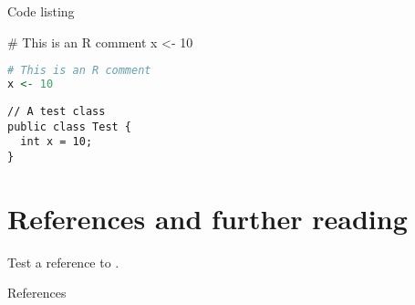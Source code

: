 \lipsum[4]

\begin{frame}[fragile]{Code listing}

\begin{rcode}
# This is an R comment
x <- 10
\end{rcode}

\begin{lstlisting}[language=R]
# This is an R comment
x <- 10
\end{lstlisting}

\begin{lstlisting}
// A test class
public class Test {
  int x = 10;
}

\end{lstlisting}
\end{frame}


\section*{References and further reading}
Test a reference to \citep{Tantau_2004}.

\begin{frame}[allowframebreaks]{References} 
\scriptsize


\end{frame}



